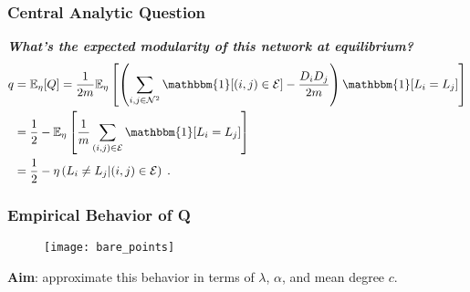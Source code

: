 \documentclass{beamer}
\newcommand\E[0]{\mathbb{E}}
\begin{document}
		
		\begin{frame}\frametitle{Central Analytic Question}
			\emph{\textbf{What's the expected modularity of this network at equilibrium?}}
			\begin{align*}
				q &= \E_\eta[Q] = \frac{1}{2m}\E_\eta\left[\left(\sum_{i,j \in \mathcal{N}^2} \mathbbm{1}[(i,j) \in \mathcal{E} ] - \frac{D_i D_j}{2m}\right)\mathbbm{1}[L_i = L_j]\right] \\ 
				&= \frac{1}{2} - \E_\eta\left[\frac{1}{m} \sum_{(i,j) \in \mathcal{E}} \mathbbm{1}[L_i = L_j]\right] \\ 
				&= \frac{1}{2} - \eta\left(L_i \neq L_j|(i,j) \in \mathcal{E}\right)\;.
			\end{align*}
		\end{frame}
	
		
		\begin{frame}\frametitle{Empirical Behavior of Q}
		  	\begin{figure}
		  		\centering
		  		\texttt{[image: bare\_points]}
		  	\end{figure}
		  	\textbf{Aim}: approximate this behavior in terms of $\lambda$, $\alpha$, and mean degree $c$.
		\end{frame}
	
		
\end{document}
